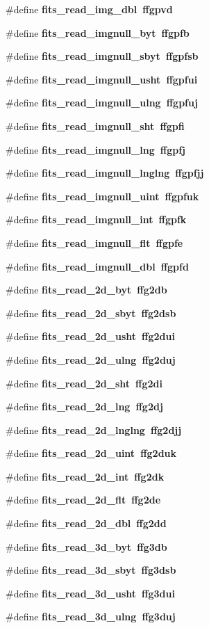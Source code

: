 \begin{CompactItemize}
\#define \bf{fits\_\-read\_\-img\_\-dbl}~ffgpvd
\item 
\#define \bf{fits\_\-read\_\-imgnull\_\-byt}~ffgpfb
\item 
\#define \bf{fits\_\-read\_\-imgnull\_\-sbyt}~ffgpfsb
\item 
\#define \bf{fits\_\-read\_\-imgnull\_\-usht}~ffgpfui
\item 
\#define \bf{fits\_\-read\_\-imgnull\_\-ulng}~ffgpfuj
\item 
\#define \bf{fits\_\-read\_\-imgnull\_\-sht}~ffgpfi
\item 
\#define \bf{fits\_\-read\_\-imgnull\_\-lng}~ffgpfj
\item 
\#define \bf{fits\_\-read\_\-imgnull\_\-lnglng}~ffgpfjj
\item 
\#define \bf{fits\_\-read\_\-imgnull\_\-uint}~ffgpfuk
\item 
\#define \bf{fits\_\-read\_\-imgnull\_\-int}~ffgpfk
\item 
\#define \bf{fits\_\-read\_\-imgnull\_\-flt}~ffgpfe
\item 
\#define \bf{fits\_\-read\_\-imgnull\_\-dbl}~ffgpfd
\item 
\#define \bf{fits\_\-read\_\-2d\_\-byt}~ffg2db
\item 
\#define \bf{fits\_\-read\_\-2d\_\-sbyt}~ffg2dsb
\item 
\#define \bf{fits\_\-read\_\-2d\_\-usht}~ffg2dui
\item 
\#define \bf{fits\_\-read\_\-2d\_\-ulng}~ffg2duj
\item 
\#define \bf{fits\_\-read\_\-2d\_\-sht}~ffg2di
\item 
\#define \bf{fits\_\-read\_\-2d\_\-lng}~ffg2dj
\item 
\#define \bf{fits\_\-read\_\-2d\_\-lnglng}~ffg2djj
\item 
\#define \bf{fits\_\-read\_\-2d\_\-uint}~ffg2duk
\item 
\#define \bf{fits\_\-read\_\-2d\_\-int}~ffg2dk
\item 
\#define \bf{fits\_\-read\_\-2d\_\-flt}~ffg2de
\item 
\#define \bf{fits\_\-read\_\-2d\_\-dbl}~ffg2dd
\item 
\#define \bf{fits\_\-read\_\-3d\_\-byt}~ffg3db
\item 
\#define \bf{fits\_\-read\_\-3d\_\-sbyt}~ffg3dsb
\item 
\#define \bf{fits\_\-read\_\-3d\_\-usht}~ffg3dui
\item 
\#define \bf{fits\_\-read\_\-3d\_\-ulng}~ffg3duj
\item 

\end{CompactItemize}
